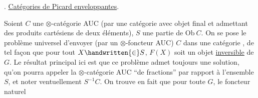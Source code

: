  . \uline{Catégories de Picard enveloppantes}.

Soient $C$ une  $\otimes$-catégorie AUC (par  une catégorie avec objet final et admettant des produits cartésiens de deux éléments), $S$ une partie de $\mathrm{Ob}\ C$. On se pose le problème universel d'envoyer (par un $\otimes$-foncteur AUC) $C$ dans une \inserted{$\otimes$-}catégorie , de tel façon que pour tout $X\handwritten{\in} S$, $F(X)$ soit un objet \uline{inversible} de $G$. Le résultat principal ici est que ce problème admet toujours une solution, qu'on pourra appeler la $\otimes$-catégorie AUC ``de fractions'' par rapport à l'ensemble $S$, et noter ventuellement $S^{-1}C$. On trouve en fait que pour toute $G$, le foncteur naturel
